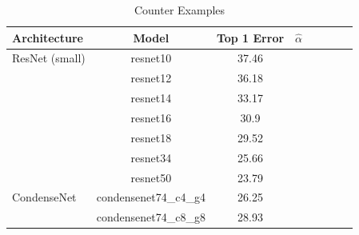 \begin{table}[t]
\small
\begin{center}
\begin{tabular}{|p{1in}|c|c|c|c|c|c|c|}
\hline
Architecture 
 & Model
 & Top 1 Error & $\hat{\alpha}$ \\
\hline
ResNet (small)  & resnet10 & 37.46 & \\
& resnet12 & 36.18 & \\
& resnet14 & 33.17 & \\
& resnet16 & 30.9 & \\
& resnet18 & 29.52 & \\
& resnet34 & 25.66 & \\
& resnet50 & 23.79 & \\
\hline
CondenseNet & condensenet74\_c4\_g4 & 26.25 & \\
& condensenet74\_c8\_g8 & 28.93 & \\
\hline
\end{tabular}
\end{center}
\caption{Counter Examples}
\label{table:models}
\end{table}



